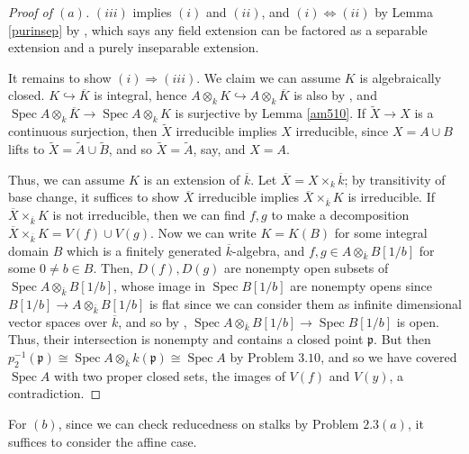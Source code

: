 \documentclass[12pt,letterpaper]{article}
\theoremstyle{definition}
\theoremstyle{remark}
\numberwithin{equation}{section}
\numberwithin{figure}{problem}
\DeclareMathOperator{\Spec}{Spec}
\begin{document}
\begin{proof}[Proof of $(a)$]
  $(iii)$ implies $(i)$ and $(ii)$, and $(i) \Leftrightarrow (ii)$ by Lemma \ref{purinsep} by \cite[Thm.~19.14]{Isa09}, which says any field extension can be factored as a separable extension and a purely inseparable extension.
  \par It remains to show $(i) \Rightarrow (iii)$. We claim we can assume $K$ is algebraically closed. $K \hookrightarrow \overline{K}$ is integral, hence $A \otimes_k K \hookrightarrow A \otimes_k \overline{K}$ is also by \cite[Exc.~5.3]{AM69}, and $\Spec A \otimes_k \overline{K} \to \Spec A \otimes_k K$ is surjective by Lemma \ref{am510}. If $\tilde{X} \to X$ is a continuous surjection, then $\tilde{X}$ irreducible implies $X$ irreducible, since $X = A \cup B$ lifts to $\tilde{X} = \tilde{A} \cup \tilde{B}$, and so $\tilde{X} = \tilde{A}$, say, and $X = A$.
  \par Thus, we can assume $K$ is an extension of $\overline{k}$. Let $\overline{X} = X \times_{k} \overline{k}$; by transitivity of base change, it suffices to show $\overline{X}$ irreducible implies $\overline{X} \times_{\overline{k}} K$ is irreducible. If $\overline{X} \times_{\overline{k}} K$ is not irreducible, then we can find $f,g$ to make a decomposition $\overline{X} \times_{\overline{k}} K = V(f) \cup V(g)$. Now we can write $K = K(B)$ for some integral domain $B$ which is a finitely generated $\overline{k}$-algebra, and $f,g \in A \otimes_{\overline{k}} B[1/b]$ for some $0 \ne b \in B$. Then, $D(f),D(g)$ are nonempty open subsets of $\Spec A \otimes_{\overline{k}} B[1/b]$, whose image in $\Spec B[1/b]$ are nonempty opens since $B[1/b] \to A \otimes_{\overline{k}} B[1/b]$ is flat since we can consider them as infinite dimensional vector spaces over $\overline{k}$, and so by \cite[Exc.~7.25]{AM69}, $\Spec A \otimes_{\overline{k}} B[1/b] \to \Spec B[1/b]$ is open. Thus, their intersection is nonempty and contains a closed point $\mathfrak{p}$. But then $p_2^{-1}(\mathfrak{p}) \cong \Spec A \otimes_{\overline{k}} k(\mathfrak{p}) \cong \Spec A$ by Problem $3.10$, and so we have covered $\Spec A$ with two proper closed sets, the images of $V(f)$ and $V(y)$, a contradiction.
\end{proof}
For $(b)$, since we can check reducedness on stalks by Problem $2.3(a)$, it suffices to consider the affine case.
\end{document}
